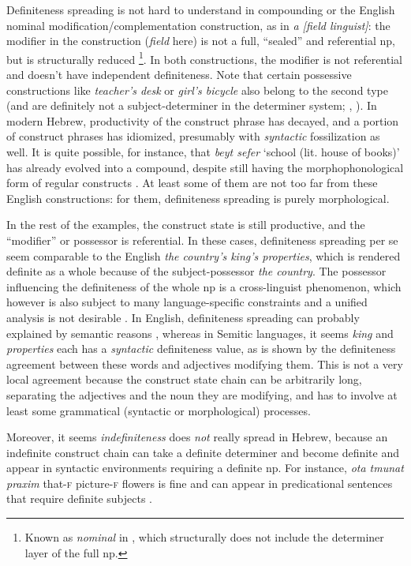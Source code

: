 \documentclass[a4paper, oneside, 12pt]{report}
\newcommand*{\citepage}[1]{p.~{#1}}
\newcommand{\form}[1]{\emph{#1}}
\newcommand{\category}[1]{\textsc{#1}}
\newcommand{\translate}[1]{`#1'}
\begin{document}
Definiteness spreading is not hard to understand in compounding
or the English nominal modification/complementation construction, as in \form{a [field linguist]}:
the modifier in the construction (\form{field} here) is not a full, ``sealed'' and referential \ac{np},
but is structurally reduced%
\footnote{
    Known as \form{nominal} in \citet{cgel},
    which structurally does not include the determiner layer of the full \ac{np}.
}.
In both constructions, the modifier is not referential
and doesn't have independent definiteness.
Note that certain possessive constructions like \form{teacher's desk} or \form{girl's bicycle} also belong to the second type
(and are definitely not a subject-determiner in the determiner system;
\citealt[\citepage{469}]{cgel}, \citealt{alexiadou2005possessors}).
In modern Hebrew, productivity of the construct phrase has decayed,
and a portion of construct phrases has idiomized,
presumably with \emph{syntactic} fossilization as well.
It is quite possible, for instance, that \form{beyt sefer} \translate{school (lit. house of books)}
has already evolved into a compound,
despite still having the morphophonological form of regular constructs
\citep{siloni2003prosodic}.
At least some of them are not too far from these English constructions:
for them, definiteness spreading is purely morphological.

In the rest of the examples, the construct state is still productive,
and the ``modifier'' or possessor is referential.
In these cases, definiteness spreading per se seem comparable to the English \form{the country's king's properties},
which is rendered definite as a whole because of the subject-possessor \form{the country}.
The possessor influencing the definiteness of the whole \ac{np}
is a cross-linguist phenomenon,
which however is also subject to many language-specific constraints
and a unified analysis is not desirable \citep{alexiadou2005possessors}.
In English, definiteness spreading can probably explained by semantic reasons
\citep{dobrovie2000definiteness},
whereas in Semitic languages, it seems \form{king} and \form{properties} each has a \emph{syntactic} definiteness value,
as is shown by the definiteness agreement between these words and adjectives modifying them.
This is not a very local agreement because the construct state chain can be arbitrarily long,
separating the adjectives and the noun they are modifying,
and has to involve at least some grammatical (syntactic or morphological) processes.

Moreover, it seems \emph{indefiniteness} does \emph{not} really spread in Hebrew,
because an indefinite construct chain can take a definite determiner
and become definite and appear in syntactic environments requiring a definite \ac{np}.
For instance, \form{ota tmunat praxim} that-\category{f} picture-\category{f} flowers
is fine and can appear in predicational sentences that require definite subjects
\citep{alexiadou2005possessors}.
\end{document}
